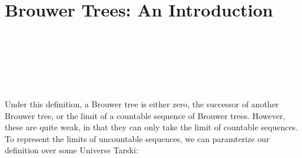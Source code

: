 \section{Brouwer Trees: An Introduction}
\begin{code}[hide]%
%
\>[2]\AgdaSpace{}%
\AgdaSpace{}%
\AgdaSpace{}%
\AgdaSpace{}%
\AgdaSymbol{(}\AgdaSpace{}%
\AgdaSymbol{;}\AgdaSpace{}%
\AgdaOperator{\AgdaFunction{\AgdaUnderscore{}<\AgdaUnderscore{}}}\AgdaSymbol{)}\<%
\\
%
\>[2]\AgdaSpace{}%
\AgdaSpace{}%
\<%
\\
%
\>[2]\AgdaSpace{}%
\AgdaSpace{}%
\<%
\\
%
\>[2]\AgdaSpace{}%
\AgdaSpace{}%
\<%
\\
%
\>[2]\AgdaSpace{}%
\AgdaSpace{}%
\<%
\\
\>[0]\<%
\end{code}

Under this definition, a Brouwer tree is either zero, the successor of another Brouwer tree, or the limit of a countable sequence of Brouwer trees. However, these are quite weak, in that they can only take the limit of countable sequences.
To represent the limits of uncountable sequences, we can paramterize our definition over some Universe \ala Tarski:

\begin{code}%
\>[0][@{}l@{\AgdaIndent{1}}]%
\>[2]\AgdaSpace{}%
\AgdaSpace{}%
\AgdaSymbol{\{}\AgdaSymbol{\}}\<%
\\
\>[2][@{}l@{\AgdaIndent{0}}]%
\>[4]\AgdaSymbol{(}\AgdaSpace{}%
\AgdaSymbol{:}\AgdaSpace{}%
\AgdaSpace{}%
\AgdaSymbol{)}\<%
\\
%
\>[4]\AgdaSymbol{(}\AgdaSpace{}%
\AgdaSymbol{:}\AgdaSpace{}%
\AgdaSpace{}%
\AgdaSpace{}%
\AgdaSpace{}%
\AgdaSymbol{)}\<%
\\
%
\>[4]\AgdaSymbol{(}\AgdaSpace{}%
\AgdaSymbol{:}\AgdaSpace{}%
\AgdaSymbol{)}\AgdaSpace{}%
\AgdaSymbol{(}\AgdaSpace{}%
\AgdaSymbol{:}\AgdaSpace{}%
\AgdaSpace{}%
\AgdaSymbol{(}\AgdaSpace{}%
\AgdaSymbol{)}\AgdaSpace{}%
\AgdaSpace{}%
\AgdaSymbol{)}\AgdaSpace{}%
\<%
\end{code}

